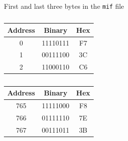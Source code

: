 \documentclass[letterpaper, 12pt]{article} %
\begin{document}
\begin{table}[!htb]
    \caption{First and last three bytes in the \texttt{mif} file}
    \begin{subtable}{.5\linewidth}
      \centering
        \caption{}
        \begin{tabular}{|c|c|c|}
            \hline
            Address & Binary & Hex \\ \hline
            0 & 11110111 & F7 \\ \hline
            1 & 00111100 & 3C \\ \hline
            2 & 11000110 & C6 \\ \hline
        \end{tabular}
    \end{subtable}%
    \begin{subtable}{.5\linewidth}
      \centering
        \caption{}
        \begin{tabular}{|c|c|c|}
            \hline
            Address & Binary & Hex \\ \hline
            765 & 11111000 & F8 \\ \hline
            766 & 01111110 & 7E \\ \hline
            767 & 00111011 & 3B \\ \hline
        \end{tabular}
    \end{subtable}
\end{table}
\end{document}
